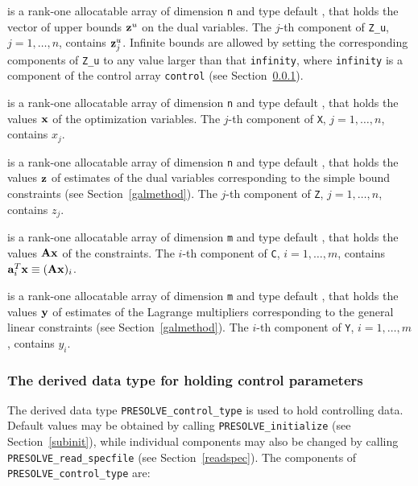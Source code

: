 \documentclass{galahad}
\newcommand{\packagename}{PRESOLVE}
\begin{document}
\begin{description}
 is a rank-one allocatable array of dimension {\tt n} and type 
default \realdp, that holds
the vector of upper bounds ${\mathbf{z}}^{u}$ on the dual variables.
The $j$-th component of {\tt Z\_u}, $j = 1, \ldots , n$, 
contains ${\mathbf{z}}_{j}^{u}$.
Infinite bounds are allowed by setting the corresponding 
components of {\tt Z\_u} to any value larger than that {\tt infinity}, 
where {\tt infinity} is a component of the control array {\tt control} 
(see Section~\ref{typecontrol}).

 is a rank-one allocatable array of dimension {\tt n} and type 
default \realdp, 
that holds the values ${\mathbf{x}}$ of the optimization variables.
The $j$-th component of {\tt X}, $j = 1,  \ldots , n$, contains $x_{j}$.  

 is a rank-one allocatable array of dimension {\tt n} and type default 
\realdp, that holds
the values ${\mathbf{z}}$ of estimates  of the dual variables 
corresponding to the simple bound constraints (see Section~\ref{galmethod}).
The $j$-th component of {\tt Z}, $j = 1,  \ldots ,  n$, contains $z_{j}$.  

 is a rank-one allocatable array of dimension {\tt m} and type default 
\realdp, that holds
the values ${\mathbf{A}} {\mathbf{x}}$ of the constraints.
The $i$-th component of {\tt C}, $i = 1,  \ldots ,  m$, contains 
${\mathbf{a}}_{i}^{T}{\mathbf{x}} \equiv ({\mathbf{A}} {\mathbf{x}})_{i}$.  

 is a rank-one allocatable array of dimension {\tt m} and type 
default \realdp, that holds
the values ${\mathbf{y}}$ of estimates  of the Lagrange multipliers
corresponding to the general linear constraints (see Section~\ref{galmethod}).
The $i$-th component of {\tt Y}, $i = 1,  \ldots ,  m$, contains $y_{i}$.  

\end{description}



\subsubsection{The derived data type for holding control 
 parameters}\label{typecontrol}
The derived data type 
{\tt \packagename\_control\_type} 
is used to hold controlling data. Default values may be obtained by calling 
{\tt \packagename\_initialize} (see Section~\ref{subinit}),
while individual components may also be changed by calling 
{\tt \packagename\_read\-\_specfile}
(see Section~\ref{readspec}). 
The components of 
{\tt \packagename\_control\_type} 
are:
\end{document}

